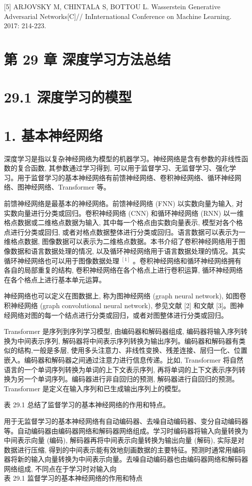 \documentclass[10pt]{article}
\begin{document}
[5] ARJOVSKY M, CHINTALA S, BOTTOU L. Wasserstein Generative Adversarial Networks[C]// InInternational Conference on Machine Learning. 2017: 214-223.

\section*{第 29 章 深度学习方法总结}
\section*{29.1 深度学习的模型}
\section*{1. 基本神经网络}
深度学习是指以复杂神经网络为模型的机器学习。神经网络是含有参数的非线性函数的复合函数, 其参数通过学习得到, 可以用于监督学习、无监督学习、强化学习。用于监督学习的基本神经网络有前馈神经网络、卷积神经网络、循环神经网络、图神经网络、Transformer 等。

前馈神经网络是最基本的神经网络。前馈神经网络 (FNN) 以实数向量为输入, 对实数向量进行分类或回归。卷积神经网络 (CNN) 和循环神经网络 (RNN) 以一维格点数据或二维格点数据为输入, 其中每一个格点由实数向量表示, 模型对各个格点进行分类或回归, 或者对格点数据整体进行分类或回归。语言数据可以表示为一维格点数据, 图像数据可以表示为二维格点数据。本书介绍了卷积神经网络用于图像数据和语言数据处理的情况, 以及循环神经网络用于语言数据处理的情况。其实循环神经网络也可以用于图像数据处理 ${ }^{[1]}$ 。卷积神经网络和循环神经网络拥有各自的局部重复的结构, 卷积神经网络在各个格点上进行卷积运算, 循环神经网络在各个格点上进行基本单元运算。

神经网络也可以定义在图数据上, 称为图神经网络 (graph neural network), 如图卷积神经网络 (graph convolutional neural network), 参见文献 [2] 和文献 [3]。图神经网络对图的每一个结点进行分类或回归，或者对图整体进行分类或回归。

Transformer 是序列到序列学习模型, 由编码器和解码器组成, 编码器将输入序列转换为中间表示序列, 解码器将中间表示序列转换为输出序列。编码器和解码器有类似的结构,一般是多层, 使用多头注意力、非线性变换、残差连接、层归一化、位置嵌入。编码器和解码器之间通过注意力进行信息传递。比如, Transformer 将自然语言的一个单词序列转换为单词的上下文表示序列, 再将单词的上下文表示序列转换为另一个单词序列。编码器进行非自回归的预测, 解码器进行自回归的预测。Transformer 是定义在输入序列和已生成输出序列上的模型。

表 29.1 总结了监督学习的基本神经网络的作用和特点。

用于无监督学习的基本神经网络有自动编码器、去噪自动编码器、变分自动编码器等。自动编码器由编码器网络和解码器网络组成。学习时编码器将输入向量转换为中间表示向量 (编码), 解码器再将中间表示向量转换为输出向量 (解码), 实际是对数据进行压缩, 得到的中间表示能有效地刻画数据的主要特征。预测时通常用编码器将新的输入向量转换为中间表示向量。去噪自动编码器也由编码器网络和解码器网络组成, 不同点在于学习时对输入向\\
表 29.1 监督学习的基本神经网络的作用和特点
\end{document}
